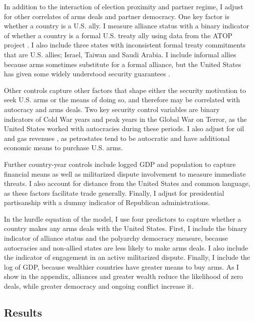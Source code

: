 \documentclass[12pt]{article}
\begin{document}
In addition to the interaction of election proximity and partner regime, I adjust for other correlates of arms deals and partner democracy. 
One key factor is whether a country is a U.S. ally. 
I measure alliance status with a binary indicator of whether a country is a formal U.S. treaty ally using data from the ATOP project \citep{Leedsetal2002}.
I also include three states with inconsistent formal treaty commitments that are U.S. allies; Israel, Taiwan and Saudi Arabia. 
I include informal allies because arms sometimes substitute for a formal alliance, but the United States has given some widely understood security guarantees \citep{Yarhi-Miloetal2016}. 


Other controls capture other factors that shape either the security motivation to seek U.S. arms or the means of doing so, and therefore may be correlated with autocracy and arms deals. 
Two key security control variables are binary indicators of Cold War years and peak years in the Global War on Terror, as the United States worked with autocracies during these periods. 
I also adjust for oil and gas revenues \citep{RossMahdavi2015}, as petrostates tend to be autocratic and have additional economic means to purchase U.S. arms.


Further country-year controls include logged GDP and population to capture financial means as well as militarized dispute involvement to measure immediate threats.
I also account for distance from the United States and common language, as these factors facilitate trade generally. 
Finally, I adjust for presidential partisanship with a dummy indicator of Republican administrations.  


In the hurdle equation of the model, I use four predictors to capture whether a country makes any arms deals with the United States. 
First, I include the binary indicator of alliance status and the polyarchy democracy measure, because autocracies and non-allied states are less likely to make arms deals. 
I also include the indicator of engagement in an active militarized dispute. 
Finally, I include the log of GDP, because wealthier countries have greater means to buy arms.
As I show in the appendix, alliances and greater wealth reduce the likelihood of zero deals, while greater democracy and ongoing conflict increase it. 


\subsection{Results}
\end{document}

